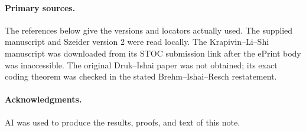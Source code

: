 \documentclass[11pt]{article}
\theoremstyle{definition}
\theoremstyle{remark}
\begin{document}
\paragraph{Primary sources.}
The references below give the versions and locators actually used.
The supplied manuscript and Szeider version 2 were read locally.
The Krapivin--Li--Shi manuscript was downloaded from its STOC
submission link after the ePrint body was inaccessible. The
original Druk--Ishai paper was not obtained; its exact coding
theorem was checked in the stated Brehm--Ishai--Resch restatement.

\paragraph{Acknowledgments.}
AI was used to produce the results, proofs, and text of this note.
\end{document}
